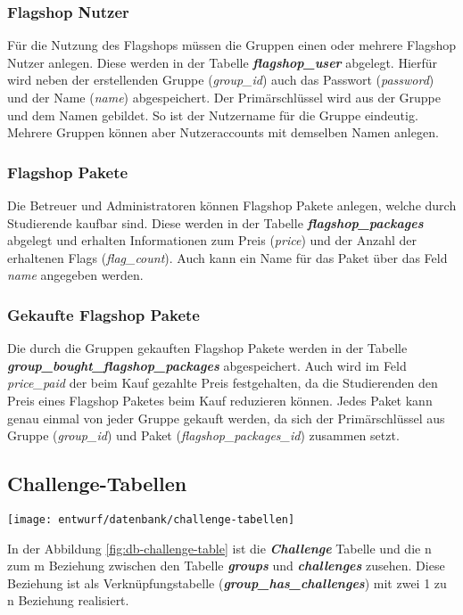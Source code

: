 \subsubsection{Flagshop Nutzer}
Für die Nutzung des Flagshops müssen die Gruppen einen oder mehrere Flagshop Nutzer anlegen. Diese werden in der Tabelle \textbf{\textit{flagshop\_user}} abgelegt. Hierfür wird neben der erstellenden Gruppe (\textit{group\_id}) auch das Passwort (\textit{password}) und der Name (\textit{name})  abgespeichert. Der Primärschlüssel wird aus der Gruppe und dem Namen gebildet. So ist der Nutzername für die Gruppe eindeutig. Mehrere Gruppen können aber Nutzeraccounts mit demselben Namen anlegen.

\subsubsection{Flagshop Pakete}
Die Betreuer und Administratoren können Flagshop Pakete anlegen, welche durch Studierende kaufbar sind. Diese werden in der Tabelle \textbf{\textit{flagshop\_packages}} abgelegt und erhalten Informationen zum Preis (\textit{price}) und der Anzahl der erhaltenen Flags (\textit{flag\_count}). Auch kann ein Name für das Paket über das Feld \textit{name} angegeben werden.

\subsubsection{Gekaufte Flagshop Pakete}
Die durch die Gruppen gekauften Flagshop Pakete werden in der Tabelle\\ \textbf{\textit{group\_bought\_flagshop\_packages}} abgespeichert. Auch wird im Feld \textit{price\_paid} der beim Kauf gezahlte Preis festgehalten, da die Studierenden den Preis eines Flagshop Paketes beim Kauf reduzieren können. Jedes Paket kann genau einmal von jeder Gruppe gekauft werden, da sich der Primärschlüssel aus Gruppe (\textit{group\_id}) und Paket (\textit{flagshop\_packages\_id}) zusammen setzt.

\subsection{Challenge-Tabellen}
\begin{center}
	\texttt{[image: entwurf/datenbank/challenge-tabellen]}
	\label{fig:db-challenge-table}
\end{center}
In der Abbildung \ref{fig:db-challenge-table} ist die \textbf{\textit{Challenge}} Tabelle und die n zum m Beziehung zwischen den Tabelle \textbf{\textit{groups}} und \textbf{\textit{challenges}} zusehen. Diese Beziehung ist als Verknüpfungstabelle (\textbf{\textit{group\_has\_challenges}}) mit zwei 1 zu n Beziehung realisiert.

